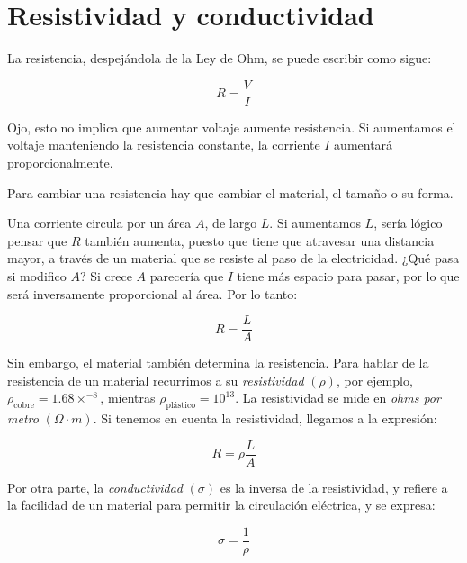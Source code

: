 \section{Resistividad y conductividad}

La resistencia,
despejándola de la Ley de Ohm, 
se puede escribir como sigue:

\begin{equation*}
    R=\frac{V}{I}
\end{equation*}

Ojo, 
esto no implica que aumentar voltaje aumente resistencia.
Si aumentamos el voltaje manteniendo la resistencia constante,
la corriente \(I\) aumentará proporcionalmente.

Para cambiar una resistencia hay que cambiar el material,
el tamaño o su forma.

Una corriente circula por un área \(A\),
de largo \(L\).
Si aumentamos \(L\), sería lógico pensar que \(R\) también aumenta,
puesto que tiene que atravesar una distancia mayor,
a través de un material que se resiste al paso de la electricidad.
¿Qué pasa si modifico \(A\)?
Si crece \(A\) parecería que \(I\) tiene más espacio para pasar,
por lo que será inversamente proporcional al área.
Por lo tanto:

\vspace{.5cm}
\begin{equation*}
    R=\frac{L}{A}
\end{equation*}
\vspace{.5cm}

Sin embargo, el material también determina la resistencia.
Para hablar de la resistencia de un material 
recurrimos a su \textit{resistividad} \((\rho)\),
por ejemplo,
\(\rho_{\text{cobre}}=1.68\times^{-8}\), 
mientras \(\rho_{\text{plástico}}=10^{13}\).
La resistividad se mide en \textit{ohms por metro} \((\Omega\cdot m)\).
Si tenemos en cuenta la resistividad, llegamos a la expresión:

\vspace{.5cm}
\begin{equation*}
    R=\rho\frac{L}{A}
\end{equation*}
\vspace{.5cm}

Por otra parte, la \textit{conductividad} \((\sigma)\) 
es la inversa de la resistividad,
y refiere a la facilidad de un material para permitir la circulación eléctrica,
y se expresa:

\vspace{.5cm}
\begin{equation*}
    \sigma = \frac{1}{\rho}
\end{equation*}
\vspace{.5cm}
